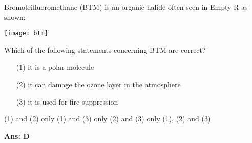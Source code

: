 \documentclass[border=3pt,varwidth=70mm]{standalone}
\begin{document}
Bromotrifluoromethane (BTM) is an organic halide often seen in Empty R as shown:   
\begin{center}
\texttt{[image: btm]}
\end{center}
Which of the following statements concerning BTM are correct?

\begin{itemize}
\item[(1)] it is a polar molecule
\item[(2)] it can damage the ozone layer in the atmosphere
\item[(3)] it is used for fire suppression
\end{itemize}

\begin{choices}
\choice (1) and (2) only
\choice (1) and (3) only
\choice (2) and (3) only
\choice (1), (2) and (3)
\end{choices}

\begin{answer}
\hrulefill\par
\textbf{Ans: D}


\end{answer}
\end{document}
